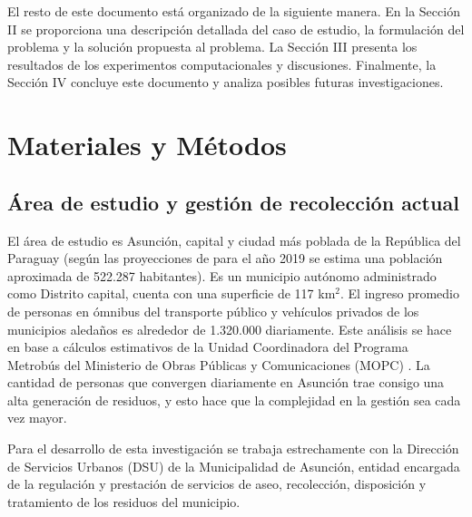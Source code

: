 \documentclass[spanish, conference]{IEEEtran}
\begin{document}
El resto de este documento está organizado de la siguiente manera. En la Sección II se proporciona una descripción detallada del caso de estudio, la formulación del problema y la solución propuesta al problema. La Sección III presenta los resultados de los experimentos computacionales y discusiones. Finalmente, la Sección IV concluye este documento y analiza posibles futuras investigaciones.

\section{Materiales y Métodos}

\subsection{Área de estudio y gestión de recolección actual}

El área de estudio es Asunción, capital y ciudad más poblada de la República del Paraguay (según las proyecciones de \cite{DireccionGeneraldeEstadistica2015Paraguay2000-2025} para el año 2019 se estima una población aproximada de 522.287 habitantes). Es un municipio autónomo administrado como Distrito capital, cuenta con una superficie de 117 km$^{2}$. El ingreso promedio de personas en ómnibus del transporte público y vehículos privados de los municipios aledaños es alrededor de 1.320.000 diariamente. Este análisis se hace en base a cálculos estimativos de la Unidad Coordinadora del Programa Metrobús del Ministerio de Obras Públicas y Comunicaciones (MOPC) \cite{DiarioABCColor2016PorColor}. La cantidad de personas que convergen diariamente en Asunción trae consigo una alta generación de residuos, y esto hace que la complejidad en la gestión sea cada vez mayor.

Para el desarrollo de esta investigación se trabaja estrechamente con la Dirección de Servicios Urbanos (DSU) de la Municipalidad de Asunción, entidad encargada de la regulación y prestación de servicios de aseo, recolección, disposición y tratamiento de los residuos del municipio.

\end{document}
